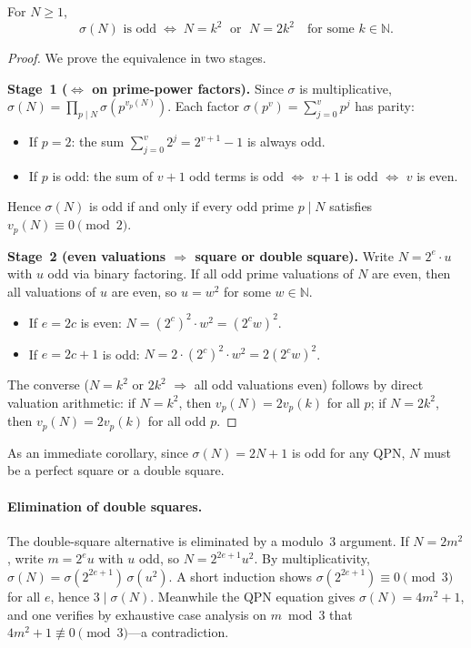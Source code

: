 \begin{theorem}\label{thm:parity-sigma}
For $N \ge 1$,
\[
  \sigma(N) \text{ is odd}
  \;\Longleftrightarrow\;
  N = k^{2} \;\text{ or }\; N = 2k^{2}
  \quad\text{for some } k \in \mathbb{N}.
\]
\end{theorem}
\begin{proof}
We prove the equivalence in two stages.

\smallskip\noindent\textbf{Stage~1 ($\Leftrightarrow$ on prime-power factors).}
Since $\sigma$ is multiplicative, $\sigma(N) = \prod_{p \mid N} \sigma(p^{v_p(N)})$.
Each factor $\sigma(p^v) = \sum_{j=0}^{v} p^j$ has parity:
\begin{itemize}
  \item If $p = 2$: the sum $\sum_{j=0}^{v} 2^j = 2^{v+1}-1$ is always odd.
  \item If $p$ is odd: the sum of $v+1$ odd terms is odd $\Leftrightarrow$ $v+1$ is odd $\Leftrightarrow$ $v$ is even.
\end{itemize}
Hence $\sigma(N)$ is odd if and only if every odd prime $p \mid N$ satisfies $v_p(N) \equiv 0 \pmod{2}$.

\smallskip\noindent\textbf{Stage~2 (even valuations $\Rightarrow$ square or double square).}
Write $N = 2^e \cdot u$ with $u$ odd via binary factoring.
If all odd prime valuations of $N$ are even, then all valuations of $u$ are even, so $u = w^2$ for some $w \in \mathbb{N}$.
\begin{itemize}
  \item If $e = 2c$ is even: $N = (2^c)^2 \cdot w^2 = (2^c w)^2$.
  \item If $e = 2c+1$ is odd: $N = 2 \cdot (2^c)^2 \cdot w^2 = 2(2^c w)^2$.
\end{itemize}
The converse ($N = k^2$ or $2k^2$ $\Rightarrow$ all odd valuations even) follows by direct valuation arithmetic: if $N = k^2$, then $v_p(N) = 2v_p(k)$ for all $p$; if $N = 2k^2$, then $v_p(N) = 2v_p(k)$ for all odd $p$.
\end{proof}

As an immediate corollary, since $\sigma(N) = 2N+1$ is odd for any QPN, $N$ must be a perfect square or a double square.

\paragraph{Elimination of double squares.}
The double-square alternative is eliminated by a modulo~3 argument.
If $N = 2m^{2}$, write $m = 2^{e}u$ with $u$ odd, so
$N = 2^{2e+1} u^{2}$.  By multiplicativity,
$\sigma(N) = \sigma(2^{2e+1})\,\sigma(u^{2})$.
A short induction shows $\sigma(2^{2e+1})\equiv 0 \pmod{3}$ for all $e$,
hence $3 \mid \sigma(N)$.  Meanwhile the QPN equation gives
$\sigma(N) = 4m^{2}+1$, and one verifies by exhaustive case analysis on
$m \bmod 3$ that $4m^{2}+1 \not\equiv 0 \pmod{3}$---a contradiction.

